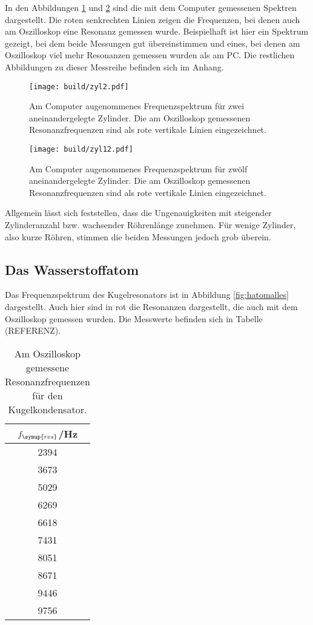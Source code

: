 In den Abbildungen \ref{fig:zyl2} und \ref{fig:zyl12} sind die mit dem Computer gemessenen
Spektren dargestellt. Die roten senkrechten Linien zeigen die Frequenzen, bei denen
auch am Oszilloskop eine Resonanz gemessen wurde. Beispielhaft ist hier ein Spektrum
gezeigt, bei dem beide Messungen gut übereinstimmen und eines, bei denen am Oszilloskop
viel mehr Resonanzen gemessen wurden als am PC. Die restlichen Abbildungen zu dieser
Messreihe befinden sich im Anhang.

\begin{figure}
  \centering
  \texttt{[image: build/zyl2.pdf]}
  \caption{Am Computer augenommenes Frequenzspektrum für zwei aneinandergelegte
  Zylinder. Die am Oszilloskop gemessenen Resonanzfrequenzen sind als rote vertikale
  Linien eingezeichnet.}
  \label{fig:zyl2}
\end{figure}
\begin{figure}
  \centering
  \texttt{[image: build/zyl12.pdf]}
  \caption{Am Computer augenommenes Frequenzspektrum für zwölf aneinandergelegte
  Zylinder. Die am Oszilloskop gemessenen Resonanzfrequenzen sind als rote vertikale
  Linien eingezeichnet.}
  \label{fig:zyl12}
\end{figure}


Allgemein lässt sich feststellen, dass die Ungenauigkeiten mit steigender Zylinderanzahl
bzw. wachsender Röhrenlänge zunehmen. Für wenige Zylinder, also kurze Röhren, stimmen
die beiden Messungen jedoch grob überein.

\subsection{Das Wasserstoffatom}
\label{subsec:hatom}

Das Frequenzspektrum des Kugelresonators ist in Abbildung \ref{fig:hatomalles} dargestellt.
Auch hier sind in rot die Resonanzen dargestellt, die auch mit dem Oszilloskop
gemessen wurden. Die Messwerte befinden sich in Tabelle (REFERENZ).

\begin{table}[htp]
	\begin{center}
    \caption{Am Oszilloskop gemessene Resonanzfrequenzen für den Kugelkondensator.}
		\begin{tabular}{c}
		\toprule
			{$f_\symup{res}$/Hz}\\
			\midrule
			2394\\
			3673\\
			5029\\
			6269\\
			6618\\
			7431\\
			8051\\
			8671\\
			9446\\
			9756\\
		\bottomrule
		\end{tabular}
	\end{center}
\end{table}

